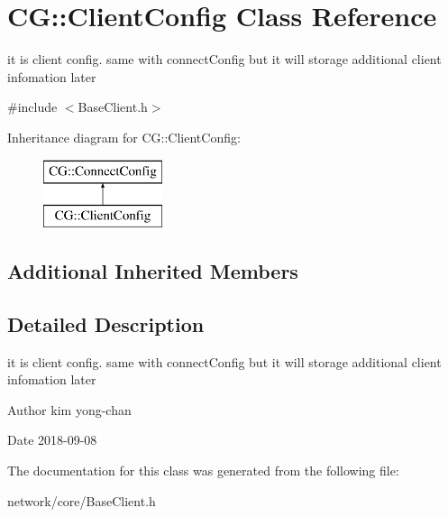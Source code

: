 \hypertarget{class_c_g_1_1_client_config}{}\section{CG\+:\+:Client\+Config Class Reference}
\label{class_c_g_1_1_client_config}


it is client config. same with connect\+Config but it will storage additional client infomation later  




{\ttfamily \#include $<$Base\+Client.\+h$>$}

Inheritance diagram for CG\+:\+:Client\+Config\+:\begin{figure}[H]
\begin{center}
\leavevmode
\includegraphics[height=2.000000cm]{class_c_g_1_1_client_config}
\end{center}
\end{figure}
\subsection*{Additional Inherited Members}


\subsection{Detailed Description}
it is client config. same with connect\+Config but it will storage additional client infomation later 

\begin{DoxyAuthor}{Author}
kim yong-\/chan 
\end{DoxyAuthor}
\begin{DoxyDate}{Date}
2018-\/09-\/08 
\end{DoxyDate}


The documentation for this class was generated from the following file\+:\begin{DoxyCompactItemize}
\item 
network/core/Base\+Client.\+h\end{DoxyCompactItemize}

